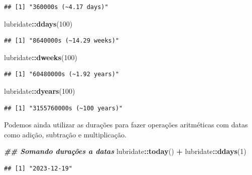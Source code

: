 \documentclass[
]{article}
\newenvironment{Shaded}{\begin{snugshade}}{\end{snugshade}}
\newcommand{\DecValTok}[1]{\textcolor[rgb]{0.00,0.00,0.81}{#1}}
\newcommand{\DocumentationTok}[1]{\textcolor[rgb]{0.56,0.35,0.01}{\textbf{\textit{#1}}}}
\newcommand{\FunctionTok}[1]{\textcolor[rgb]{0.13,0.29,0.53}{\textbf{#1}}}
\newcommand{\NormalTok}[1]{#1}
\newcommand{\SpecialCharTok}[1]{\textcolor[rgb]{0.81,0.36,0.00}{\textbf{#1}}}
\begin{document}
\begin{verbatim}
## [1] "360000s (~4.17 days)"
\end{verbatim}

\begin{Shaded}
\begin{Highlighting}[]
\NormalTok{lubridate}\SpecialCharTok{::}\FunctionTok{ddays}\NormalTok{(}\DecValTok{100}\NormalTok{)}
\end{Highlighting}
\end{Shaded}

\begin{verbatim}
## [1] "8640000s (~14.29 weeks)"
\end{verbatim}

\begin{Shaded}
\begin{Highlighting}[]
\NormalTok{lubridate}\SpecialCharTok{::}\FunctionTok{dweeks}\NormalTok{(}\DecValTok{100}\NormalTok{)}
\end{Highlighting}
\end{Shaded}

\begin{verbatim}
## [1] "60480000s (~1.92 years)"
\end{verbatim}

\begin{Shaded}
\begin{Highlighting}[]
\NormalTok{lubridate}\SpecialCharTok{::}\FunctionTok{dyears}\NormalTok{(}\DecValTok{100}\NormalTok{)}
\end{Highlighting}
\end{Shaded}

\begin{verbatim}
## [1] "3155760000s (~100 years)"
\end{verbatim}

Podemos ainda utilizar as durações para fazer operações aritméticas com datas como adição, subtração e multiplicação.

\begin{Shaded}
\begin{Highlighting}[]
\DocumentationTok{\#\# Somando durações a datas}
\NormalTok{lubridate}\SpecialCharTok{::}\FunctionTok{today}\NormalTok{() }\SpecialCharTok{+}\NormalTok{ lubridate}\SpecialCharTok{::}\FunctionTok{ddays}\NormalTok{(}\DecValTok{1}\NormalTok{)}
\end{Highlighting}
\end{Shaded}

\begin{verbatim}
## [1] "2023-12-19"
\end{verbatim}
\end{document}
